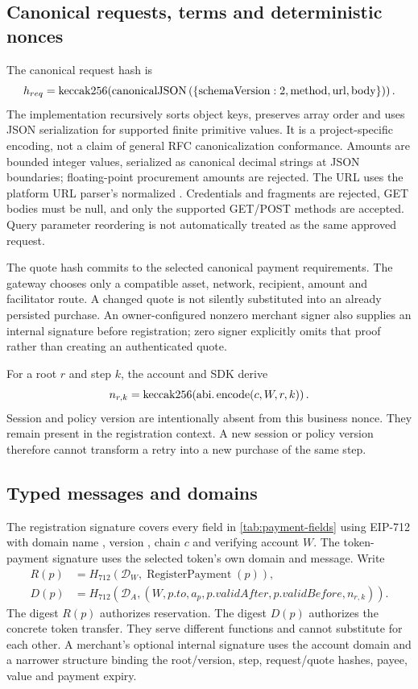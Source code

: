 \subsection{Canonical requests, terms and deterministic nonces}
The canonical request hash is
\begin{equation}
 h_{req}=\operatorname{keccak256}\!\left(\operatorname{canonicalJSON}\left(\{\text{schemaVersion}:2,\text{method},\text{url},\text{body}\}\right)\right).
\end{equation}
The implementation recursively sorts object keys, preserves array order and uses JSON serialization for supported finite primitive values. It is a project-specific encoding, not a claim of general RFC canonicalization conformance. Amounts are bounded integer values, serialized as canonical decimal strings at JSON boundaries; floating-point procurement amounts are rejected. The URL uses the platform URL parser's normalized . Credentials and fragments are rejected, GET bodies must be null, and only the supported GET/POST methods are accepted. Query parameter reordering is not automatically treated as the same approved request.

The quote hash commits to the selected canonical payment requirements. The gateway chooses only a compatible asset, network, recipient, amount and facilitator route. A changed quote is not silently substituted into an already persisted purchase. An owner-configured nonzero merchant signer also supplies an internal  signature before registration; zero signer explicitly omits that proof rather than creating an authenticated quote.

For a root $r$ and step $k$, the account and SDK derive
\begin{equation}\label{eq:nonce}
 n_{r,k}=\operatorname{keccak256}\!\left(\operatorname{abi.encode}(c,W,r,k)\right).
\end{equation}
Session and policy version are intentionally absent from this business nonce. They remain present in the registration context. A new session or policy version therefore cannot transform a retry into a new purchase of the same step.

\subsection{Typed messages and domains}
The registration signature covers every field in \cref{tab:payment-fields} using EIP-712 with domain name , version , chain $c$ and verifying account $W$.\citep{erc712} The token-payment signature uses the selected token's own domain and  message. Write
\begin{align}
 R(p)&=H_{712}(\mathcal D_W,\operatorname{RegisterPayment}(p)),\\
 D(p)&=H_{712}(\mathcal D_A,(W,p.to,a_p,p.validAfter,p.validBefore,n_{r,k})).
\end{align}
The digest $R(p)$ authorizes reservation. The digest $D(p)$ authorizes the concrete token transfer. They serve different functions and cannot substitute for each other. A merchant's optional internal signature uses the account domain and a narrower  structure binding the root/version, step, request/quote hashes, payee, value and payment expiry.

